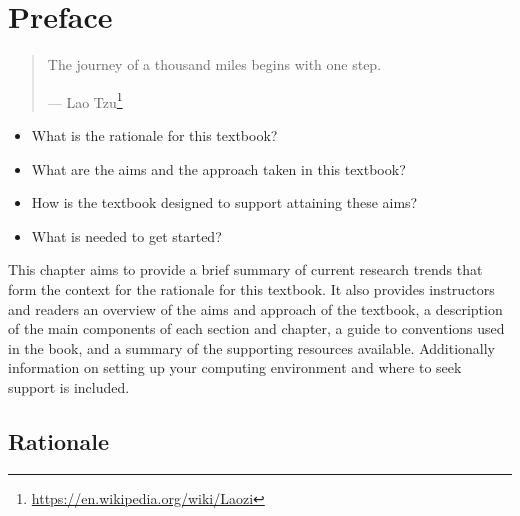 \documentclass[
  letterpaper,
]{scrbook}
\providecommand{\tightlist}{%
  \setlength{\itemsep}{0pt}\setlength{\parskip}{0pt}}\usepackage{longtable,booktabs,array}
\DeclareRobustCommand{\href}[2]{#2\footnote{\url{#1}}}
\begin{document}

\hypertarget{sec-preface}{%
\chapter*{Preface}\label{sec-preface}}


\begin{quote}
The journey of a thousand miles begins with one step.

--- \href{https://en.wikipedia.org/wiki/Laozi}{Lao Tzu}
\end{quote}

\begin{tcolorbox}[enhanced jigsaw, title=\textcolor{quarto-callout-note-color}{\faInfo}\hspace{0.5em}{Keys}, breakable, colback=white, colframe=quarto-callout-note-color-frame, bottomrule=.15mm, left=2mm, bottomtitle=1mm, colbacktitle=quarto-callout-note-color!10!white, opacityback=0, arc=.35mm, toprule=.15mm, coltitle=black, leftrule=.75mm, opacitybacktitle=0.6, toptitle=1mm, titlerule=0mm, rightrule=.15mm]

\begin{itemize}
\tightlist
\item
  What is the rationale for this textbook?
\item
  What are the aims and the approach taken in this textbook?
\item
  How is the textbook designed to support attaining these aims?
\item
  What is needed to get started?
\end{itemize}

\end{tcolorbox}

This chapter aims to provide a brief summary of current research trends
that form the context for the rationale for this textbook. It also
provides instructors and readers an overview of the aims and approach of
the textbook, a description of the main components of each section and
chapter, a guide to conventions used in the book, and a summary of the
supporting resources available. Additionally information on setting up
your computing environment and where to seek support is included.

\hypertarget{rationale}{%
\section*{Rationale}\label{rationale}}
\end{document}
